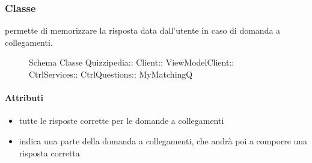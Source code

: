 \subsubsection{Classe }
permette di memorizzare la risposta data dall'utente in caso di domanda a collegamenti.
\begin{figure}[H]
\centering
\noindent{}
\caption[Schema Classe MyMatchingQ]{Schema Classe Quizzipedia:: Client:: ViewModelClient:: CtrlServices:: CtrlQuestions:: MyMatchingQ}
\end{figure}
\paragraph{Attributi}
\begin{itemize}
\item {}
\newline
tutte le risposte corrette per le domande a collegamenti
\item {}
\newline
indica una parte della domanda a collegamenti, che andrà poi a comporre una risposta corretta
\end{itemize}
